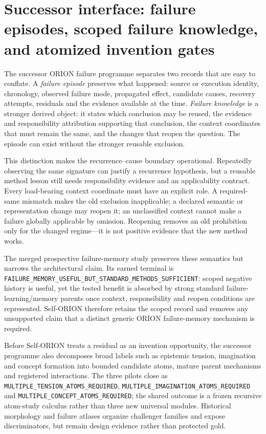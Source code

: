\section{Successor interface: failure episodes, scoped failure knowledge, and atomized invention gates}
\label{sec:p5-successor-failure-discovery}

The successor ORION failure programme separates two records that are easy to conflate. A \emph{failure episode} preserves what happened: source or execution identity, chronology, observed failure mode, propagated effect, candidate causes, recovery attempts, residuals and the evidence available at the time. \emph{Failure knowledge} is a stronger derived object: it states which conclusion may be reused, the evidence and responsibility attribution supporting that conclusion, the context coordinates that must remain the same, and the changes that reopen the question. The episode can exist without the stronger reusable exclusion.

This distinction makes the recurrence--cause boundary operational. Repeatedly observing the same signature can justify a recurrence hypothesis, but a reusable method lesson still needs responsibility evidence and an applicability contract. Every load-bearing context coordinate must have an explicit role. A required-same mismatch makes the old exclusion inapplicable; a declared semantic or representation change may reopen it; an unclassified context cannot make a failure globally applicable by omission. Reopening removes an old prohibition only for the changed regime---it is not positive evidence that the new method works.

The merged prospective failure-memory study preserves these semantics but narrows the architectural claim. Its earned terminal is \texttt{FAILURE\_MEMORY\_USEFUL\_BUT\_STANDARD\_METHODS\_SUFFICIENT}: scoped negative history is useful, yet the tested benefit is absorbed by strong standard failure-learning/memory parents once context, responsibility and reopen conditions are represented. Self-ORION therefore retains the scoped record and removes any unsupported claim that a distinct generic ORION failure-memory mechanism is required.

Before Self-ORION treats a residual as an invention opportunity, the successor programme also decomposes broad labels such as epistemic tension, imagination and concept formation into bounded candidate atoms, mature parent mechanisms and registered interactions. The three pilots close as \texttt{MULTIPLE\_TENSION\_ATOMS\_REQUIRED}, \texttt{MULTIPLE\_IMAGINATION\_ATOMS\_REQUIRED} and \texttt{MULTIPLE\_CONCEPT\_ATOMS\_REQUIRED}; the shared outcome is a frozen recursive atom-study calculus rather than three new universal modules. Historical morphology and failure atlases organize challenger families and expose discriminators, but remain design evidence rather than protected gold.

